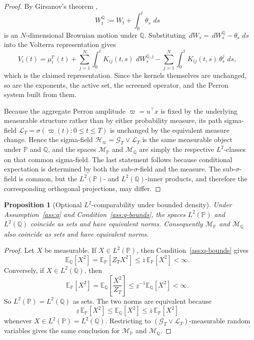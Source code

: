 \documentclass[11pt,a4paper]{amsart}
\theoremstyle{plain}
\newtheorem{proposition}[theorem]{Proposition}
\theoremstyle{definition}
\theoremstyle{remark}
\newcommand{\PP}{\mathbb{P}}
\newcommand{\QQ}{\mathbb{Q}}
\newcommand{\EE}{\mathbb{E}}
\newcommand{\cG}{\mathcal{G}}
\newcommand{\cH}{\mathcal{H}}
\newcommand{\cL}{\mathcal{L}}
\newcommand{\cM}{\mathcal{M}}
\newcommand{\dd}{\,d}
\begin{document}
\begin{proof}
By Girsanov's theorem \cite{karatzasShreve1991},
\[
        W_t^\QQ:=W_t+\int_0^t \theta_s\,\dd s
\]
is an \(N\)-dimensional Brownian motion under \(\QQ\).  Substituting
\(\dd W_s=\dd W_s^\QQ-\theta_s\,\dd s\) into the Volterra representation gives
\[
        V_i(t)
        =
        \mu_i^\PP(t)
        +
        \sum_{j=1}^N \int_0^t K_{ij}(t,s)\,\dd W_s^{\QQ,j}
        -
        \sum_{j=1}^N \int_0^t K_{ij}(t,s)\,\theta_s^j\,\dd s,
\]
which is the claimed representation.  Since the kernels themselves are unchanged, so are the
exponents, the active set, the screened operator, and the Perron system built from them.

Because the aggregate Perron amplitude \(\varpi=u^\top x\) is fixed by the underlying
measurable structure rather than by either probability measure, its path sigma-field
\(\cL_T=\sigma(\varpi(t):0\le t\le T)\) is unchanged by the equivalent measure change.  Hence the
sigma-field \(\cH_\varpi=\cG_T\vee\cL_T\) is the same measurable object under \(\PP\) and
\(\QQ\), and the spaces \(\cM_\PP\) and \(\cM_\QQ\) are simply the respective \(L^2\)-classes on
that common sigma-field.  The last statement follows because conditional expectation is determined
by both the sub-\(\sigma\)-field and the measure.  The sub-\(\sigma\)-field is common, but the
\(L^2(\PP)\)- and \(L^2(\QQ)\)-inner products, and therefore the corresponding orthogonal
projections, may differ.
\end{proof}

\begin{proposition}[Optional \(L^2\)-comparability under bounded density]\label{prop:q-bounds}
Under Assumption~\ref{ass:q} and Condition~\ref{ass:q-bounds}, the spaces \(L^2(\PP)\) and \(L^2(\QQ)\)
coincide as sets and have equivalent norms.  Consequently \(\cM_\PP\) and \(\cM_\QQ\) also
coincide as sets and have equivalent norms.
\end{proposition}

\begin{proof}
Let \(X\) be measurable.  If \(X\in L^2(\PP)\), then Condition~\ref{ass:q-bounds} gives
\[
        \EE_{\QQ}[X^2]
        =
        \EE_{\PP}[Z_T X^2]
        \le
        \overline z\,\EE_{\PP}[X^2]
        <\infty.
\]
Conversely, if \(X\in L^2(\QQ)\), then
\[
        \EE_{\PP}[X^2]
        =
        \EE_{\QQ}\!\left[\frac{X^2}{Z_T}\right]
        \le
        \underline z^{-1}\EE_{\QQ}[X^2]
        <\infty.
\]
So \(L^2(\PP)=L^2(\QQ)\) as sets.  The two norms are equivalent because
\[
        \underline z\,\EE_{\PP}[X^2]
        \le
        \EE_{\QQ}[X^2]
        \le
        \overline z\,\EE_{\PP}[X^2]
\]
whenever \(X\in L^2(\PP)=L^2(\QQ)\).  Restricting to \((\cG_T\vee\cL_T)\)-measurable random
variables gives the same conclusion for \(\cM_\PP\) and \(\cM_\QQ\).
\end{proof}
\end{document}
